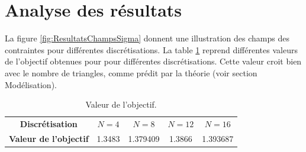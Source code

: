 \section{Analyse des résultats}
La figure \ref{fig:ResultatsChampsSigma} donnent une illustration des champs des contraintes pour différentes discrétisations. La table \ref{table:objectif} reprend différentes valeurs de l'objectif obtenues pour pour différentes discrétisations. Cette valeur croit bien avec le nombre de triangles, comme prédit par la théorie (voir section Modélisation). 

\begin{table}
\centering
\begin{tabular}{c|cccc}
\textbf{Discrétisation} & $N=4$ & $N=8$ & $N=12$ & $N=16$\\
\textbf{Valeur de l'objectif} & 1.3483 & 1.379409 & 1.3866 & 1.393687 \\
\end{tabular}
\caption{Valeur de l'objectif.}
\label{table:objectif}
\end{table} 

